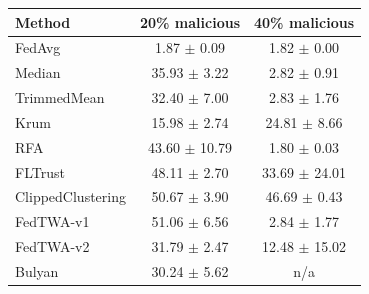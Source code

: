 \begin{tabular}{lcc}
\toprule
Method & 20\% malicious & 40\% malicious \\
\midrule
FedAvg & 1.87 $\pm$ 0.09 & 1.82 $\pm$ 0.00 \\
Median & 35.93 $\pm$ 3.22 & 2.82 $\pm$ 0.91 \\
TrimmedMean & 32.40 $\pm$ 7.00 & 2.83 $\pm$ 1.76 \\
Krum & 15.98 $\pm$ 2.74 & 24.81 $\pm$ 8.66 \\
RFA & 43.60 $\pm$ 10.79 & 1.80 $\pm$ 0.03 \\
FLTrust & 48.11 $\pm$ 2.70 & 33.69 $\pm$ 24.01 \\
ClippedClustering & 50.67 $\pm$ 3.90 & 46.69 $\pm$ 0.43 \\
FedTWA-v1 & 51.06 $\pm$ 6.56 & 2.84 $\pm$ 1.77 \\
FedTWA-v2 & 31.79 $\pm$ 2.47 & 12.48 $\pm$ 15.02 \\
Bulyan & 30.24 $\pm$ 5.62 & n/a \\
\bottomrule
\end{tabular}